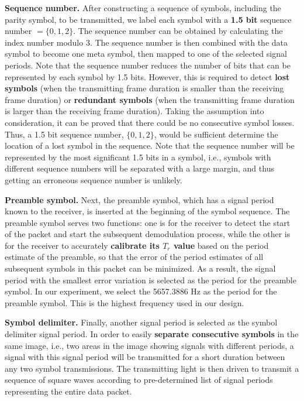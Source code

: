 \textbf{Sequence number.} After constructing a sequence of symbols, including the parity symbol, to be transmitted, we label each symbol with a \textbf{1.5 bit} sequence number $=\{0,1,2\}$.
The sequence number can be obtained by calculating the index number modulo 3.
The sequence number is then combined with the data symbol to become one meta symbol, then mapped to one of the selected signal periods.
Note that the sequence number reduces the number of bits that can be represented by each symbol by 1.5 bits. However, this is required to detect \textbf{lost symbols} (when the transmitting frame duration is smaller than the receiving frame duration) or \textbf{redundant symbols} (when the transmitting frame duration is larger than the receiving frame duration).
Taking the assumption into consideration, it can be proved that there could be no consecutive symbol losses. Thus, a 1.5 bit sequence number, $\{0,1,2\}$, would be sufficient determine the location of a lost symbol in the sequence. 
Note that the sequence number will be represented by the most significant 1.5 bits in a symbol, i.e., symbols with different sequence numbers will be separated with a large margin, and thus getting an erroneous sequence number is unlikely.

\textbf{Preamble symbol.} Next, the preamble symbol, which has a signal period known to the receiver, is inserted at the beginning of the symbol sequence.
The preamble symbol serves two functions: one is for the receiver to detect the start of the packet and start the subsequent demodulation process, while the other is for the receiver to accurately \textbf{calibrate its $T_r$ value} based on the period estimate of the preamble, so that the error of the period estimates of all subsequent symbols in this packet can be minimized. As a result, the signal period with the smallest error variation is selected as the period for the preamble symbol. In our experiment, we select the 5657.3886 Hz as the period for the preamble symbol. This is the highest frequency used in our design. 

\textbf{Symbol delimiter.} Finally, another signal period is selected as the symbol delimiter signal period.
In order to easily \textbf{separate consecutive symbols} in the same image, i.e., two areas in the image showing signals with different periods, a signal with this signal period will be transmitted for a short duration between any two symbol transmissions. %
The transmitting light is then driven to transmit a sequence of square waves according to pre-determined list of signal periods representing the entire data packet.

